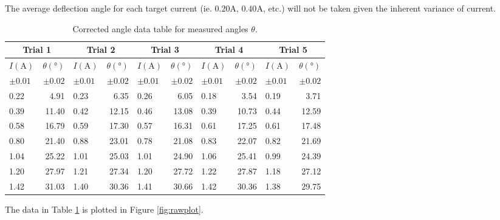 The average deflection angle for each target current (ie. $0.20\si{\ampere}$, $0.40\si{\ampere}$, etc.) will not be taken given the inherent variance of current. %

\begin{table}[H]
	\centering
	\begin{tabular}{|lr||lr||lr||lr||lr|}
		\hline
		\multicolumn{2}{|c||}{Trial 1} & \multicolumn{2}{|c||}{Trial 2} & \multicolumn{2}{c||}{Trial 3}& \multicolumn{2}{c||}{Trial 4}& \multicolumn{2}{c|}{Trial 5} \\
		\hline
		$I(\si{\ampere})$ & $\theta(\si{\degree})$ & $I(\si{\ampere})$ & $\theta(\si{\degree})$ & $I(\si{\ampere})$ & $\theta(\si{\degree})$ & $I(\si{\ampere})$ & $\theta(\si{\degree})$ & $I(\si{\ampere})$ & $\theta(\si{\degree})$ \\
		$\pm0.01$ & $\pm0.02$ & $\pm0.01$ & $\pm0.02$ & $\pm0.01$ & $\pm0.02$ & $\pm0.01$ & $\pm0.02$ & $\pm0.01$ & $\pm0.02$ \\
		\hline
		0.22 & 4.91 & 0.23 & 6.35 & 0.26 & 6.05 & 0.18 & 3.54 & 0.19 & 3.71 \\
		0.39 & 11.40 & 0.42 & 12.15 & 0.46 & 13.08 & 0.39 & 10.73 & 0.44 & 12.59 \\
		0.58 & 16.79 & 0.59 & 17.30 & 0.57 & 16.31 & 0.61 & 17.25 & 0.61 & 17.48 \\
		0.80 & 21.40 & 0.88 & 23.01 & 0.78 & 21.08 & 0.83 & 22.07 & 0.82 & 21.69 \\
		1.04 & 25.22 & 1.01 & 25.03 & 1.01 & 24.90 & 1.06 & 25.41 & 0.99 & 24.39 \\
		1.20 & 27.97 & 1.21 & 27.34 & 1.20 & 27.72 & 1.22 & 27.87 & 1.18 & 27.12 \\
		1.42 & 31.03 & 1.40 & 30.36 & 1.41 & 30.66 & 1.42 & 30.36 & 1.38 & 29.75 \\
		\hline
	\end{tabular}
	\caption{Corrected angle data table for measured angles $\theta$.}
	\vspace{-10pt}
	\label{tab:raw2}
\end{table}

The data in Table \ref{tab:raw2} is plotted in Figure \ref{fig:rawplot}.

